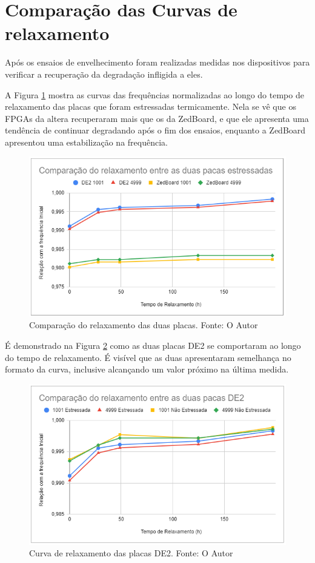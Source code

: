 \section{Comparação das Curvas de relaxamento}
\label{sec:ResRelax}

Após os ensaios de envelhecimento foram realizadas medidas nos dispositivos para verificar a recuperação da degradação infligida a eles.

A Figura \ref{fig:RelaxEstressadas} mostra as curvas das frequências normalizadas ao longo do tempo de relaxamento das placas que foram estressadas termicamente. Nela se vê que os FPGAs da altera recuperaram mais que os da ZedBoard, e que ele apresenta uma tendência de continuar degradando após o fim dos ensaios, enquanto a ZedBoard apresentou uma estabilização na frequência.

\begin{figure}[H]
    \centering
    \includegraphics[scale=0.75]{figures/Resultados/RelaxEstressadas}
    \caption{Comparação do relaxamento das duas placas. Fonte: O Autor}
    \label{fig:RelaxEstressadas}
\end{figure}

É demonstrado na Figura \ref{fig:RelaxDE2} como as duas placas DE2 se comportaram ao longo do tempo de relaxamento. É visível que as duas apresentaram semelhança no formato da curva, inclusive alcançando um valor próximo na última medida. 

\begin{figure}[H]
    \centering
    \includegraphics[scale=0.75]{figures/Resultados/RelaxDE2}
    \caption{Curva de relaxamento das placas DE2. Fonte: O Autor}
    \label{fig:RelaxDE2}
\end{figure}

